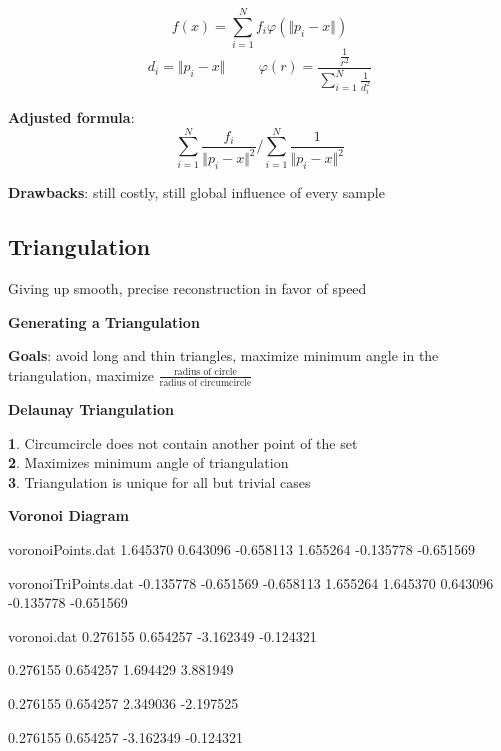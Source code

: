 $$f(x) = \sum_{i = 1}^N f_i \varphi(\Vert p_i - x \Vert)$$
$$d_i = \Vert p_i - x \Vert \hspace{1cm}
    \varphi(r) = \frac{\frac{1}{r^2}}{\sum_{i = 1}^N \frac{1}{d_i^2}}$$

\textbf{Adjusted formula}:
$$\sum_{i = 1}^N \frac{f_i}{\Vert p_i - x \Vert ^2} / \sum_{i = 1}^N \frac{1}{\Vert p_i - x \Vert ^2}$$

\textbf{Drawbacks}: still costly, still global influence of every sample

\subsection{Triangulation}
Giving up smooth, precise reconstruction in favor of speed

\textbf{Generating a Triangulation}

\textbf{Goals}: avoid long and thin triangles, maximize minimum angle in the triangulation, maximize $\frac{\text{radius of circle}}{\text{radius of circumcircle}}$

\textbf{Delaunay Triangulation}

\textbf{1}. Circumcircle does not contain another point of the set \\
\textbf{2}. Maximizes minimum angle of triangulation \\
\textbf{3}. Triangulation is unique for all but trivial cases

\textbf{Voronoi Diagram}

\begin{filecontents*}{voronoiPoints.dat}
    1.645370 0.643096
    -0.658113 1.655264
    -0.135778 -0.651569
\end{filecontents*}

\begin{filecontents*}{voronoiTriPoints.dat}
    -0.135778 -0.651569
    -0.658113 1.655264
    1.645370 0.643096
    -0.135778 -0.651569
\end{filecontents*}

\begin{filecontents*}{voronoi.dat}
    0.276155 0.654257
    -3.162349 -0.124321

    0.276155 0.654257
    1.694429 3.881949

    0.276155 0.654257
    2.349036 -2.197525

    0.276155 0.654257
    -3.162349 -0.124321
\end{filecontents*}

